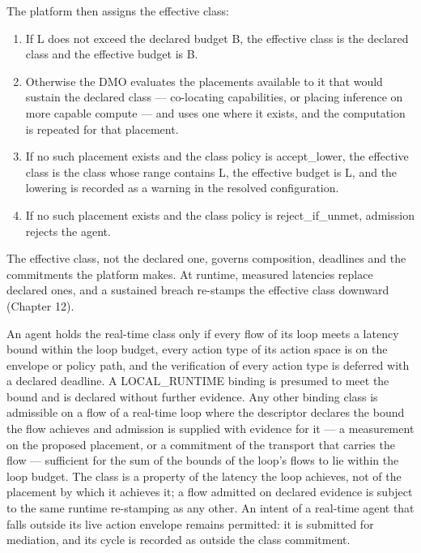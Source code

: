 The platform then assigns the effective class:

\begin{enumerate}
\def\labelenumi{\arabic{enumi}.}
\tightlist
\item
  If L does not exceed the declared budget B, the effective class is the
  declared class and the effective budget is B.
\item
  Otherwise the DMO evaluates the placements available to it that would
  sustain the declared class --- co-locating capabilities, or placing
  inference on more capable compute --- and uses one where it exists,
  and the computation is repeated for that placement.
\item
  If no such placement exists and the class policy is
  accept\_\allowbreak{}lower, the effective class is the class whose
  range contains L, the effective budget is L, and the lowering is
  recorded as a warning in the resolved configuration.
\item
  If no such placement exists and the class policy is
  reject\_\allowbreak{}if\_\allowbreak{}unmet, admission rejects the
  agent.
\end{enumerate}

The effective class, not the declared one, governs composition,
deadlines and the commitments the platform makes. At runtime, measured
latencies replace declared ones, and a sustained breach re-stamps the
effective class downward (Chapter 12).

An agent holds the real-time class only if every flow of its loop meets
a latency bound within the loop budget, every action type of its action
space is on the envelope or policy path, and the verification of every
action type is deferred with a declared deadline. A
LOCAL\_\allowbreak{}RUNTIME binding is presumed to meet the bound and is
declared without further evidence. Any other binding class is admissible
on a flow of a real-time loop where the descriptor declares the bound
the flow achieves and admission is supplied with evidence for it --- a
measurement on the proposed placement, or a commitment of the transport
that carries the flow --- sufficient for the sum of the bounds of the
loop's flows to lie within the loop budget. The class is a property of
the latency the loop achieves, not of the placement by which it achieves
it; a flow admitted on declared evidence is subject to the same runtime
re-stamping as any other. An intent of a real-time agent that falls
outside its live action envelope remains permitted: it is submitted for
mediation, and its cycle is recorded as outside the class commitment.

